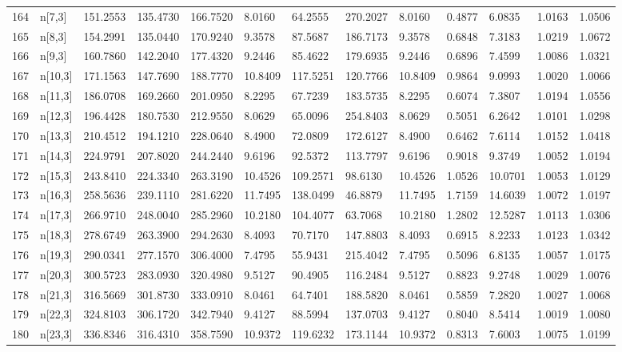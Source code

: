 \begin{table}[ht]
\begin{tabular}{rllllllllllll}
  164 & n[7,3] & 151.2553 &  135.4730 & 166.7520 &   8.0160 &    64.2555 &  270.2027 &   8.0160 &  0.4877 &  6.0835 & 1.0163 &  1.0506 \\ 
  165 & n[8,3] & 154.2991 &  135.0440 & 170.9240 &   9.3578 &    87.5687 &  186.7173 &   9.3578 &  0.6848 &  7.3183 & 1.0219 &  1.0672 \\ 
  166 & n[9,3] & 160.7860 &  142.2040 & 177.4320 &   9.2446 &    85.4622 &  179.6935 &   9.2446 &  0.6896 &  7.4599 & 1.0086 &  1.0321 \\ 
  167 & n[10,3] & 171.1563 &  147.7690 & 188.7770 &  10.8409 &   117.5251 &  120.7766 &  10.8409 &  0.9864 &  9.0993 & 1.0020 &  1.0066 \\ 
  168 & n[11,3] & 186.0708 &  169.2660 & 201.0950 &   8.2295 &    67.7239 &  183.5735 &   8.2295 &  0.6074 &  7.3807 & 1.0194 &  1.0556 \\ 
  169 & n[12,3] & 196.4428 &  180.7530 & 212.9550 &   8.0629 &    65.0096 &  254.8403 &   8.0629 &  0.5051 &  6.2642 & 1.0101 &  1.0298 \\ 
  170 & n[13,3] & 210.4512 &  194.1210 & 228.0640 &   8.4900 &    72.0809 &  172.6127 &   8.4900 &  0.6462 &  7.6114 & 1.0152 &  1.0418 \\ 
  171 & n[14,3] & 224.9791 &  207.8020 & 244.2440 &   9.6196 &    92.5372 &  113.7797 &   9.6196 &  0.9018 &  9.3749 & 1.0052 &  1.0194 \\ 
  172 & n[15,3] & 243.8410 &  224.3340 & 263.3190 &  10.4526 &   109.2571 &   98.6130 &  10.4526 &  1.0526 & 10.0701 & 1.0053 &  1.0129 \\ 
  173 & n[16,3] & 258.5636 &  239.1110 & 281.6220 &  11.7495 &   138.0499 &   46.8879 &  11.7495 &  1.7159 & 14.6039 & 1.0072 &  1.0197 \\ 
  174 & n[17,3] & 266.9710 &  248.0040 & 285.2960 &  10.2180 &   104.4077 &   63.7068 &  10.2180 &  1.2802 & 12.5287 & 1.0113 &  1.0306 \\ 
  175 & n[18,3] & 278.6749 &  263.3900 & 294.2630 &   8.4093 &    70.7170 &  147.8803 &   8.4093 &  0.6915 &  8.2233 & 1.0123 &  1.0342 \\ 
  176 & n[19,3] & 290.0341 &  277.1570 & 306.4000 &   7.4795 &    55.9431 &  215.4042 &   7.4795 &  0.5096 &  6.8135 & 1.0057 &  1.0175 \\ 
  177 & n[20,3] & 300.5723 &  283.0930 & 320.4980 &   9.5127 &    90.4905 &  116.2484 &   9.5127 &  0.8823 &  9.2748 & 1.0029 &  1.0076 \\ 
  178 & n[21,3] & 316.5669 &  301.8730 & 333.0910 &   8.0461 &    64.7401 &  188.5820 &   8.0461 &  0.5859 &  7.2820 & 1.0027 &  1.0068 \\ 
  179 & n[22,3] & 324.8103 &  306.1720 & 342.7940 &   9.4127 &    88.5994 &  137.0703 &   9.4127 &  0.8040 &  8.5414 & 1.0019 &  1.0080 \\ 
  180 & n[23,3] & 336.8346 &  316.4310 & 358.7590 &  10.9372 &   119.6232 &  173.1144 &  10.9372 &  0.8313 &  7.6003 & 1.0075 &  1.0199 \\ 
   \hline
\end{tabular}
\end{table}

